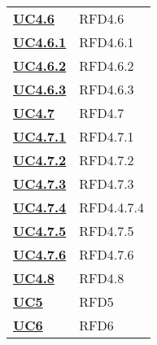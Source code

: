 \begin{longtable}[H]{| >{\centering\bfseries}p{8cm} | >{\centering\arraybackslash}p{8cm} |}
    \hyperref[ssub:uc4.6]{UC4.6}     & RFD4.6                                                                    \\

    \hyperref[par:uc4.6.1]{UC4.6.1}  & RFD4.6.1                                                                  \\

    \hyperref[par:uc4.6.2]{UC4.6.2}  & RFD4.6.2                                                                  \\

    \hyperref[par:uc4.6.3]{UC4.6.3}  & RFD4.6.3                                                                  \\


    \hyperref[ssub:uc4.7]{UC4.7}     & RFD4.7                                                                    \\

    \hyperref[par:uc4.7.1]{UC4.7.1}  & RFD4.7.1                                                                  \\

    \hyperref[par:uc4.7.2]{UC4.7.2}  & RFD4.7.2                                                                  \\

    \hyperref[par:uc4.7.3]{UC4.7.3}  & RFD4.7.3                                                                  \\

    \hyperref[par:uc4.7.4]{UC4.7.4}  & RFD4.4.7.4                                                                \\

    \hyperref[spar:uc4.7.5]{UC4.7.5} & RFD4.7.5                                                                  \\

    \hyperref[spar:uc4.7.6]{UC4.7.6} & RFD4.7.6                                                                  \\

    \hyperref[ssub:uc4.8]{UC4.8}     & RFD4.8                                                                    \\

    \hyperref[sub:uc5]{UC5}          & RFD5                                                                      \\

    \hyperref[sub:uc6]{UC6}          & RFD6                                                                      \\


\end{longtable}
